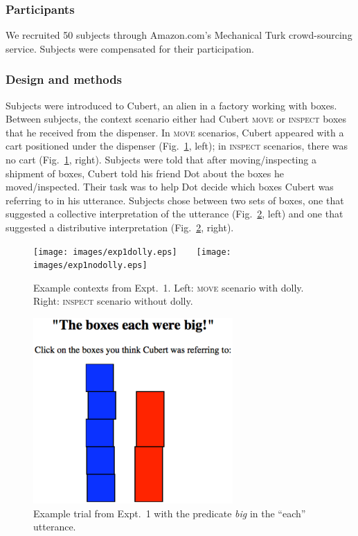\documentclass[linguex]{sp}
\begin{document}
\subsubsection{Participants}

We recruited 50 subjects through Amazon.com's Mechanical Turk crowd-sourcing service. Subjects were compensated for their participation.


\subsubsection{Design and methods}

Subjects were introduced to Cubert, an alien in a factory working with boxes. Between subjects, the context scenario either had Cubert \textsc{move} or \textsc{inspect} boxes that he received from the dispenser. In \textsc{move} scenarios, Cubert appeared with a cart positioned under the dispenser (Fig.~\ref{expt1context}, left); in \textsc{inspect} scenarios, there was no cart (Fig.~\ref{expt1context}, right). Subjects were told that after moving/inspecting a shipment of boxes, Cubert told his friend Dot about the boxes he moved/inspected. Their task was to help Dot decide which boxes Cubert was referring to in his utterance. Subjects chose between two sets of boxes, one that suggested a collective interpretation of the utterance (Fig.\ \ref{expt1trial}, left) and one that suggested a distributive interpretation (Fig.\ \ref{expt1trial}, right).

\begin{figure}[h]
	\centering
	\texttt{[image: images/exp1dolly.eps]}\ \ \ \ 
	\texttt{[image: images/exp1nodolly.eps]}
	\caption{Example contexts from Expt.~1. Left: \textsc{move} scenario with dolly. Right: \textsc{inspect} scenario without dolly.}\label{expt1context}
\end{figure}

\begin{figure}[h]
	\centering
	\includegraphics[width=3in]{images/trial2.eps}
	\caption{Example trial from Expt.~1 with the predicate \emph{big} in the ``each'' utterance.}\label{expt1trial}
\end{figure}
\end{document}
